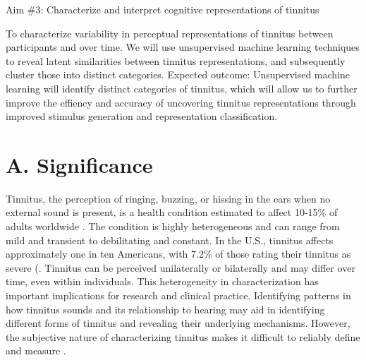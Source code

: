 \documentclass[11pt, notitlepage]{article} %
\begin{document}
\begin{description}
	\item[Aim \#3: Characterize and interpret cognitive representations of tinnitus]{} 
\end{description}

To characterize variability in perceptual representations of tinnitus between participants and over time. We will use unsupervised machine learning techniques to reveal latent similarities between tinnitus representations, and subsequently cluster those into distinct categories. Expected outcome: Unsupervised machine learning will identify distinct categories of tinnitus, which will allow us to further improve the effiency and accuracy of uncovering tinnitus representations through improved stimulus generation and representation classification. 





\newpage

\section*{A. Significance}

Tinnitus, the perception of ringing, buzzing, or hissing in the ears when no external sound is present,
is a health condition estimated to affect 10-15\% of adults worldwide \cite{henryTinnitusEpidemiologicPerspective2020}.
The condition is highly heterogeneous and can range from mild and transient to debilitating and constant.
In the U.S., tinnitus affects approximately one in ten Americans, with 7.2\% of those rating their tinnitus as severe (\cite{bhattPrevalenceSeverityExposures2016}.
Tinnitus can be perceived unilaterally or bilaterally and may differ over time, even within individuals.
This heterogeneity in characterization has important implications for research
and clinical practice.
Identifying patterns in how tinnitus sounds and its relationship to hearing may aid in identifying
different forms of tinnitus and revealing their underlying mechanisms.
However, the subjective nature of characterizing tinnitus makes it difficult
to reliably define and measure \cite{vajsakovicPrinciplesMethodsPsychoacoustic2021}.
\end{document}
